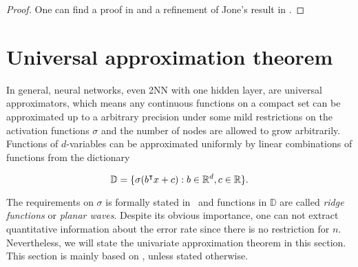 \begin{proof}
    One can find a proof in \cite{jonesSimpleLemmaGreedy1992} and a refinement
    of Jone's result in \cite[Theorem
    5]{barronUniversalApproximationBounds1993}.    
\end{proof}


\section{Universal approximation theorem}
\label{sec:uat}

In general, neural networks, even 2NN with one hidden layer, are universal
approximators, which means any continuous functions on a compact set can be
approximated up to a arbitrary precision under some mild restrictions on the
activation functions $\sigma$ and the number of nodes are allowed to grow
arbitrarily. Functions of $d$-variables can be approximated uniformly by linear
combinations of functions from the dictionary

\begin{equation}
    \label{eq:uat_dict}
    \mathbb{D} = \{\sigma(b{}^{\intercal} x + c): b \in \mathbb{R}^d, c\in \mathbb{R} \}.
\end{equation}

The requirements on $\sigma$ is formally stated
in~\cite{cybenkoApproximationSuperpositionsSigmoidal1989} and functions in
$\mathbb{D}$ are called \textit{ridge functions} or \textit{planar waves}.
Despite its obvious importance, one can not extract quantitative information
about the error rate since there is no restriction for $n$. Nevertheless, we
will state the univariate approximation theorem in this section. This section is
mainly based on \cite{cybenkoApproximationSuperpositionsSigmoidal1989}, unless
stated otherwise.


